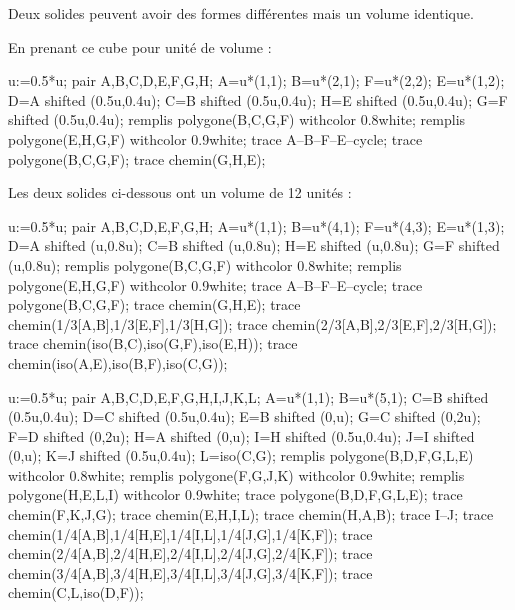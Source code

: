 \begin{remarque}
    Deux solides peuvent avoir des formes différentes mais un volume identique.

    En prenant ce cube pour unité de volume :
    \begin{Geometrie}
        u:=0.5*u;
        pair A,B,C,D,E,F,G,H;
        A=u*(1,1);
        B=u*(2,1);
        F=u*(2,2);
        E=u*(1,2);
        D=A shifted (0.5u,0.4u);
        C=B shifted (0.5u,0.4u);
        H=E shifted (0.5u,0.4u);
        G=F shifted (0.5u,0.4u);
        remplis polygone(B,C,G,F) withcolor 0.8white;
        remplis polygone(E,H,G,F) withcolor 0.9white;
        trace A--B--F--E--cycle;
        trace polygone(B,C,G,F);
        trace chemin(G,H,E);
    \end{Geometrie}
    
    Les deux solides ci-dessous ont un volume de 12 unités :

    \smallskip
    \begin{center}        
        \begin{Geometrie}
            u:=0.5*u;
            pair A,B,C,D,E,F,G,H;
            A=u*(1,1);
            B=u*(4,1);
            F=u*(4,3);
            E=u*(1,3);
            D=A shifted (u,0.8u);
            C=B shifted (u,0.8u);
            H=E shifted (u,0.8u);
            G=F shifted (u,0.8u);
            remplis polygone(B,C,G,F) withcolor 0.8white;
            remplis polygone(E,H,G,F) withcolor 0.9white;
            trace A--B--F--E--cycle;
            trace polygone(B,C,G,F);
            trace chemin(G,H,E);
            trace chemin(1/3[A,B],1/3[E,F],1/3[H,G]);
            trace chemin(2/3[A,B],2/3[E,F],2/3[H,G]);
            trace chemin(iso(B,C),iso(G,F),iso(E,H));
            trace chemin(iso(A,E),iso(B,F),iso(C,G));
        \end{Geometrie}
        \hspace*{20mm}
        \begin{Geometrie}
            u:=0.5*u;
            pair A,B,C,D,E,F,G,H,I,J,K,L;
            A=u*(1,1);
            B=u*(5,1);
            C=B shifted (0.5u,0.4u);
            D=C shifted (0.5u,0.4u);
            E=B shifted (0,u);
            G=C shifted (0,2u);
            F=D shifted (0,2u);
            H=A shifted (0,u);
            I=H shifted (0.5u,0.4u);
            J=I shifted (0,u);
            K=J shifted (0.5u,0.4u);
            L=iso(C,G);
            remplis polygone(B,D,F,G,L,E) withcolor 0.8white;
            remplis polygone(F,G,J,K) withcolor 0.9white;
            remplis polygone(H,E,L,I) withcolor 0.9white;
            trace polygone(B,D,F,G,L,E);
            trace chemin(F,K,J,G);
            trace chemin(E,H,I,L);
            trace chemin(H,A,B);
            trace I--J;
            trace chemin(1/4[A,B],1/4[H,E],1/4[I,L],1/4[J,G],1/4[K,F]);
            trace chemin(2/4[A,B],2/4[H,E],2/4[I,L],2/4[J,G],2/4[K,F]);
            trace chemin(3/4[A,B],3/4[H,E],3/4[I,L],3/4[J,G],3/4[K,F]);
            trace chemin(C,L,iso(D,F));
        \end{Geometrie}
    \end{center}
\end{remarque}